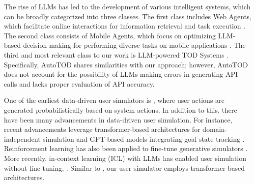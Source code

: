
 The rise of LLMs has led to the development of various intelligent systems, which can be broadly categorized into three classes. The first class includes Web Agents, which facilitate online interactions for information retrieval and task execution \cite{yao2023react, kim-etal-2024-prospector, ma2023laser, fereidouni-etal-2024-grounded, NEURIPS2022_82ad13ec, sridhar2023hierarchical, furuta2024multimodal}. The second class consists of Mobile Agents, which focus on optimizing LLM-based decision-making for performing diverse tasks on mobile applications \cite{bai2024digirl, lee2023explore, AutoDroid, wen2023droidbot, wang2024mobile, wang2024mobilev2}. The third and most relevant class to our work is LLM-powered TOD Systems \cite{chung-etal-2023-instructtods, Mi_Wang_Li_2022, gao-etal-2023-adaptive, hudecek-dusek-2023-large, UnravelingChatGPT}. Specifically, AutoTOD \cite{xu-etal-2024-rethinking} shares similarities with our approach; however, AutoTOD does not account for the possibility of LLMs making errors in generating API calls and lacks proper evaluation of API accuracy.


One of the earliest data-driven user simulators is \cite{EckertUser}, where user actions are generated probabilistically based on system actions. In addition to this, there have been many advancements in data-driven user simulation. For instance, recent advancements leverage transformer-based architectures for domain-independent simulation \cite{lin-etal-2021-domain, lin-etal-2022-gentus} and GPT-based models integrating goal state tracking \cite{liu-etal-2022-generative}. Reinforcement learning has also been applied to fine-tune generative simulators \cite{tseng-etal-2021-transferable, cheng-etal-2022-multiwoz}.
More recently, in-context learning (ICL) with LLMs has enabled user simulation without fine-tuning, \cite{terragni2023context, davidson2023user}. Similar to \cite{lin-etal-2021-domain, lin-etal-2022-gentus, liu-etal-2022-generative}, our user simulator employs transformer-based architectures.



